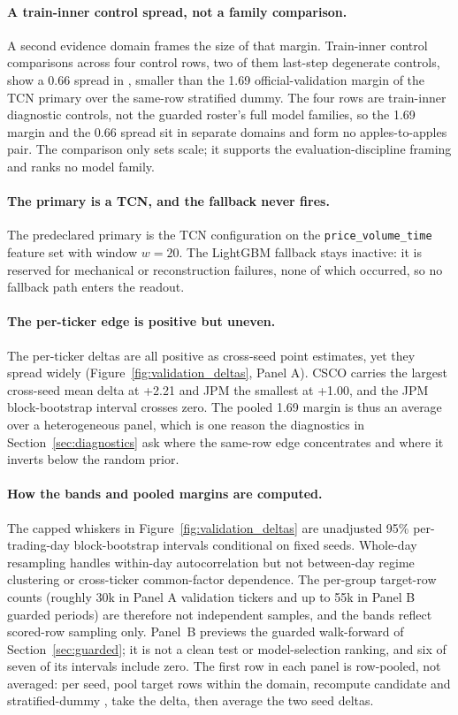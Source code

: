 \paragraph{A train-inner control spread, not a family comparison.}
A second evidence domain frames the size of that margin. Train-inner control
comparisons across four control rows, two of them last-step degenerate controls,
show a 0.66\pp{} spread in \macrofone, smaller than the 1.69\pp{}
official-validation margin of the TCN primary over the same-row stratified dummy.
The four rows are train-inner diagnostic controls, not the guarded roster's full
model families, so the 1.69\pp{} margin and the 0.66\pp{} spread sit in separate
domains and form no apples-to-apples pair. The comparison only sets scale; it
supports the evaluation-discipline framing and ranks no model family.

\paragraph{The primary is a TCN, and the fallback never fires.}
The predeclared primary is the TCN configuration on the
\texttt{price\_volume\_time} feature set with window $w=20$. The LightGBM
fallback stays inactive: it is reserved for mechanical or reconstruction
failures, none of which occurred, so no fallback path enters the readout.

\paragraph{The per-ticker edge is positive but uneven.}
The per-ticker deltas are all positive as cross-seed point estimates, yet they
spread widely (Figure~\ref{fig:validation_deltas}, Panel A). CSCO carries the
largest cross-seed mean delta at +2.21\pp{} and JPM the smallest at +1.00\pp{},
and the JPM block-bootstrap interval crosses zero. The pooled 1.69\pp{} margin is
thus an average over a heterogeneous panel, which is one reason the diagnostics in
Section~\ref{sec:diagnostics} ask where the same-row edge concentrates and where
it inverts below the random prior.

\paragraph{How the bands and pooled margins are computed.}
The capped whiskers in Figure~\ref{fig:validation_deltas} are unadjusted 95\%
per-trading-day block-bootstrap intervals conditional on fixed seeds. Whole-day
resampling handles within-day autocorrelation but not between-day regime
clustering or cross-ticker common-factor dependence. The per-group target-row
counts (roughly 30k in Panel A validation tickers and up to 55k in Panel B
guarded periods) are therefore not independent samples, and the bands reflect
scored-row sampling only. Panel~B previews the guarded walk-forward of Section~\ref{sec:guarded}; it is not a clean test or model-selection ranking, and six of seven of its intervals include zero. The first row in each panel is row-pooled, not averaged: per seed,
pool target rows within the domain, recompute candidate and stratified-dummy
\macrofone{}, take the delta, then average the two seed deltas.

